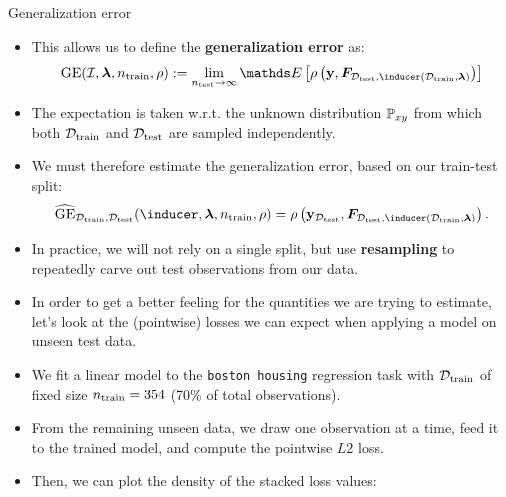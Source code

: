 \begin{vbframe}{Generalization error}

\begin{itemize}
  \item This allows us to define the \textbf{generalization error} as:
  $$\GEfull := 
  \lim_{\ntest \rightarrow \infty} \E \left[ \rho \left(
  \yv, \F_{\Dtest, \inducer(\D_{\mathrm{train}}, \lamv)} 
  \right)\right]$$
  \item The expectation is taken w.r.t. the unknown distribution $\mathbb{P}_{xy}$ from 
  which both $\mathcal{D}_{\text{train}}$ and $\mathcal{D}_{\text{test}}$ are sampled independently.
  \item We must therefore estimate the generalization error, based on our 
  train-test split:
  $$\GEh_{\Dtrain, \Dtest}(\inducer,
  \lamv, \ntrain, \rho) =
  \rho \left( \yv_{\Dtest}, \F_{\Dtest, 
  \inducer(\D_{\mathrm{train}}, \lamv)} \right).$$
  \item In practice, we will not rely on a single split, but use 
  \textbf{resampling} to repeatedly carve out test observations from our data.
\end{itemize}

\framebreak

\begin{itemize}
  \small
  \item In order to get a better feeling for the quantities we are trying to 
  estimate, let's look at the (pointwise) losses we can expect when applying 
  a model on unseen test data.
  \item We fit a linear model to the \texttt{boston housing} regression task 
  with $\mathcal{D}_{\text{train}}$ of fixed size $n_{\mathrm{train}} = 354$ (70\% of total observations).
  \item From the remaining unseen data, we draw one observation at a time, 
  feed it to the trained model, and compute the pointwise $L2$ loss.
  \item Then, we can plot the density of the stacked loss values:
\end{itemize}


\end{vbframe}
